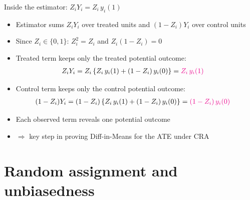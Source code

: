 \documentclass[table, xcolor = {dvipsnames}, 9pt]{beamer}
\theoremstyle{plain}
\newcommand{\mh}[1]{{\color{magenta}{#1}}}
\begin{document}
\begin{frame}[t]{Inside the estimator: $Z_i Y_i = Z_i\, y_i(1)$}
\vfill
\begin{itemize} \vfill
\item Estimator sums $Z_i Y_i$ over treated units and $(1 - Z_i) Y_i$ over control units \vfill
\item Since $Z_i \in \{0, 1\}$: $Z_i^2 = Z_i$ and $Z_i(1 - Z_i) = 0$ \vfill
\item Treated term keeps only the treated potential outcome:
\begin{align*}
Z_i Y_i &= Z_i\left\{Z_i\, y_i(1) + (1 - Z_i)\, y_i(0)\right\} = \mh{Z_i\, y_i(1)}
\end{align*} \vfill
\item Control term keeps only the control potential outcome:
\begin{align*}
(1 - Z_i) Y_i &= (1 - Z_i)\left\{Z_i\, y_i(1) + (1 - Z_i)\, y_i(0)\right\} = \mh{(1 - Z_i)\, y_i(0)}
\end{align*} \vfill
\item Each observed term reveals one potential outcome \vfill
\item[] $\Rightarrow$ key step in proving Diff-in-Means \mh{unbiased} for the ATE under CRA \vfill
\end{itemize} \vfill
\end{frame}
\section{Random assignment and unbiasedness}
\end{document}

